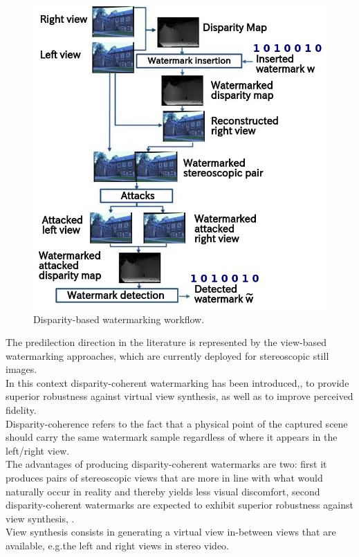 \begin{figure}[h!]
\centering
\includegraphics[width=1.05\textwidth]{./img/disparity_domain.jpg}
\caption{\small{Disparity-based watermarking workflow.}}
\label{fig:disp}
\end{figure}


The predilection direction in the literature is represented by the view-based watermarking approaches, which are currently deployed for stereoscopic still images.\\ 
In this context disparity-coherent watermarking has been introduced,\cite{DOER}, to provide superior robustness against virtual view synthesis, as well as to improve perceived fidelity.\\
Disparity-coherence refers to the fact that a physical point of the captured scene should carry the
same watermark sample regardless of where it appears in the left/right view.\\
The advantages of producing disparity-coherent watermarks are two: first it produces pairs of stereoscopic views that are more in line with
what would naturally occur in reality and thereby yields less visual discomfort, second  disparity-coherent watermarks are expected to exhibit superior robustness against view synthesis, \cite{DOER}.\\
View synthesis consists in generating a virtual view in-between views that are available, e.g.the left and right views in stereo video. 

